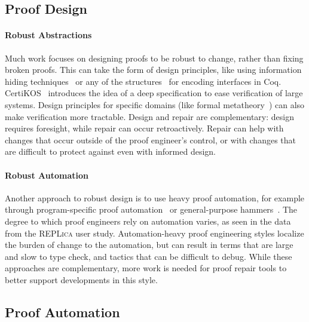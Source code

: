 \subsection{Proof Design}
\label{sec:design}


\paragraph{Robust Abstractions}
Much work focuses on designing proofs
to be robust to change, rather than fixing broken proofs.
This can take the form of design principles, like using 
information hiding techniques~\cite{Woos:2016:PCF:2854065.2854081, Klein:2014:CFV:2584468.2560537}
or any of the structures~\cite{Chrzaszcz2003, Sozeau2008, Saibi:PhD} for encoding interfaces in Coq.
CertiKOS~\cite{certikos} introduces the idea of a deep specification to ease verification of large systems.
Design principles for specific domains (like formal metatheory~\cite{Aydemir2008, Delaware2013POPL, Delaware2013ICFP})
can also make verification more tractable.
Design and repair are complementary: design requires foresight, while repair can occur retroactively.
Repair can help with changes that occur outside of the proof engineer's control,
or with changes that are difficult to protect against even with informed design.

\paragraph{Robust Automation}
Another approach to robust design is to use heavy proof automation, for example through
program-specific proof automation~\cite{chlipala:cpdt}
or general-purpose hammers~\cite{Blanchette2016b, Blanchette2013, Kaliszyk2014, Czajka2018}.
The degree to which proof engineers rely on automation varies, as seen in the data from the \textsc{REPLica} user study. %
Automation-heavy proof engineering styles localize the burden of change to the automation,
but can result in terms that are large and slow to type check,
and tactics that can be difficult to debug.
While these approaches are complementary, more work is needed for proof repair tools to better support 
developments in this style.

\subsection{Proof Automation}
\label{sec:automation}

